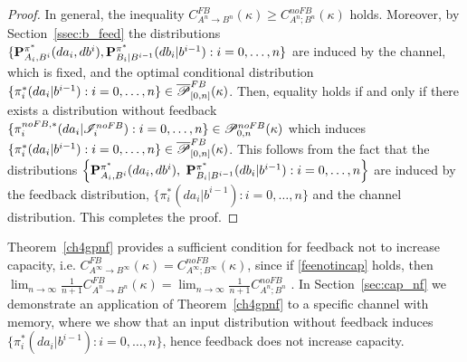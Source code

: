 \documentclass[11pt, a4paper, journal,onecolumn]{IEEEtran}
\newcommand{\rar}{\rightarrow}
\newtheorem{definition}{Definition}[section]
\begin{document}
\begin{proof}  In general,  the inequality $C_{A^n \rar B^n}^{FB}(\kappa)\geq C_{A^n ; B^n}^{noFB}(\kappa)$ holds. Moreover, by Section~\ref{ssec:b_feed} the distributions $\{{\bf  P}_{A_i, B^i}^{\pi^*}(da_i, db^i), {\bf  P}_{B_i|B^{i-1}}^{\pi^*}(db_i|b^{i-1}): i=0, \ldots, n\}$ are induced by the channel, which is fixed, and the optimal conditional distribution $\{\pi_i^*(da_i|b^{i-1}): i=0, \ldots, n\} \in \overline{\cal P}_{[0,n]}^{FB}(\kappa)$. Then, equality holds  if and only if there exists a distribution without feedback   $\{\pi_i^{noFB,*}(da_i|{\cal I}_i^{noFB}): i=0, \ldots, n\} \in   {\cal P}_{0,n}^{noFB}(\kappa)$ which induces  $\{\pi_i^*(da_i|b^{i-1}): i=0, \ldots, n\} \in \overline{\cal P}_{[0,n]}^{FB}(\kappa)$. This follows from the fact that the distributions $\Big\{{\bf  P}_{A_i, B^i}^{\pi^*}(da_i, db^i),$ ${\bf  P}_{B_i|B^{i-1}}^{\pi^*}(db_i|b^{i-1}): i=0, \ldots, n\Big\}$ are induced by the feedback distribution, $\{\pi_i^*(da_i|b^{i-1}): i=0, \ldots, n\}$ and the channel distribution. This completes the proof. 
\end{proof}
Theorem~\ref{ch4gpnf} provides a sufficient condition for feedback not to increase  capacity, i.e. $C_{A^{\infty} \rar B^{\infty}}^{FB}(\kappa)=C_{A^{\infty} ; B^{\infty}}^{noFB}(\kappa)$, since if \eqref{feenotincap} holds, then $\lim_{n\rar\infty}\frac{1}{n+1}C_{A^n \rar B^n}^{FB}(\kappa)=\lim_{n\rar\infty}\frac{1}{n+1}C_{A^n ; B^n}^{noFB}$ . In Section~\ref{sec:cap_nf} we demonstrate an application of Theorem~\ref{ch4gpnf} to a specific channel with memory, where we show that an input distribution without feedback induces $\{\pi_i^*(da_i|b^{i-1}): i=0, \ldots, n \}$, hence feedback does not increase capacity. 
%
%
%
%
%
%
%
\end{document}
